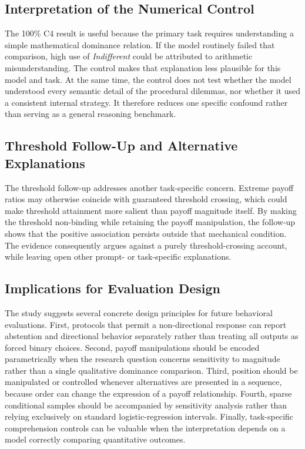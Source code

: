 \documentclass[10pt,journal,compsoc]{IEEEtran}
\begin{document}
\subsection{Interpretation of the Numerical Control}
The 100\% C4 result is useful because the primary task requires understanding a simple mathematical dominance relation. If the model routinely failed that comparison, high use of \textit{Indifferent} could be attributed to arithmetic misunderstanding. The control makes that explanation less plausible for this model and task. At the same time, the control does not test whether the model understood every semantic detail of the procedural dilemmas, nor whether it used a consistent internal strategy. It therefore reduces one specific confound rather than serving as a general reasoning benchmark.

\subsection{Threshold Follow-Up and Alternative Explanations}
The threshold follow-up addresses another task-specific concern. Extreme payoff ratios may otherwise coincide with guaranteed threshold crossing, which could make threshold attainment more salient than payoff magnitude itself. By making the threshold non-binding while retaining the payoff manipulation, the follow-up shows that the positive association persists outside that mechanical condition. The evidence consequently argues against a purely threshold-crossing account, while leaving open other prompt- or task-specific explanations.

\subsection{Implications for Evaluation Design}
The study suggests several concrete design principles for future behavioral evaluations. First, protocols that permit a non-directional response can report abstention and directional behavior separately rather than treating all outputs as forced binary choices. Second, payoff manipulations should be encoded parametrically when the research question concerns sensitivity to magnitude rather than a single qualitative dominance comparison. Third, position should be manipulated or controlled whenever alternatives are presented in a sequence, because order can change the expression of a payoff relationship. Fourth, sparse conditional samples should be accompanied by sensitivity analysis rather than relying exclusively on standard logistic-regression intervals. Finally, task-specific comprehension controls can be valuable when the interpretation depends on a model correctly comparing quantitative outcomes.
\end{document}
